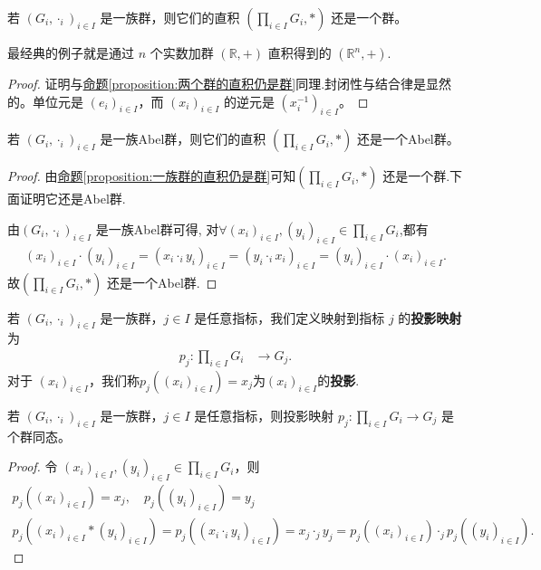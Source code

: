 \documentclass[../../main.tex]{subfiles}
\begin{document}
\begin{proposition}[一族群的直积仍是群]\label{proposition:一族群的直积仍是群}
若 $(G_i,\cdot_i)_{i\in I}$ 是一族群，则它们的直积 $(\prod_{i\in I}G_i,*)$ 还是一个群。  
\end{proposition}
\begin{note}
最经典的例子就是通过 $n$ 个实数加群 $(\mathbb{R},+)$ 直积得到的 $(\mathbb{R}^n,+)$.
\end{note}
\begin{proof}
证明与\hyperref[proposition:两个群的直积仍是群]{命题\ref{proposition:两个群的直积仍是群}}同理.封闭性与结合律是显然的。单位元是 $(e_i)_{i\in I}$，而 $(x_i)_{i\in I}$ 的逆元是 $(x_i^{-1})_{i\in I}$。 
\end{proof}

\begin{proposition}[一族Abel群的直积仍是Abel群]\label{proposition:一族Abel群的直积仍是Abel群}
若 $(G_i,\cdot_i)_{i\in I}$ 是一族Abel群，则它们的直积 $(\prod_{i\in I}G_i,*)$ 还是一个Abel群。  
\end{proposition}
\begin{proof}
由\hyperref[proposition:一族群的直积仍是群]{命题\ref{proposition:一族群的直积仍是群}}可知$(\prod_{i\in I}G_i,*)$ 还是一个群.下面证明它还是Abel群.

由$(G_i,\cdot_i)_{i\in I}$ 是一族Abel群可得,
对$\forall (x_i)_{i\in I},(y_i)_{i\in I} \in \prod_{i\in I}G_i$,都有
\begin{align*}
\left( x_i \right) _{i\in I}\cdot \left( y_i \right) _{i\in I}=\left( x_i\cdot _iy_i \right) _{i\in I}=\left( y_i\cdot _ix_i \right) _{i\in I}=\left( y_i \right) _{i\in I}\cdot \left( x_i \right) _{i\in I}.
\end{align*}
故$(\prod_{i\in I}G_i,*)$ 还是一个Abel群.
\end{proof}

\begin{definition}[投影映射]
若 $(G_i,\cdot_i)_{i\in I}$ 是一族群，$j\in I$ 是任意指标，我们定义映射到指标 $j$ 的\textbf{投影映射}为
\begin{align*}
p_j:\prod_{i\in I}G_i&\to G_j.
\end{align*}
对于 $(x_i)_{i\in I}$，我们称$p_j((x_i)_{i\in I})=x_j$为$(x_i)_{i\in I}$的\textbf{投影}.
\end{definition}

\begin{proposition}[投影映射是群同态]\label{proposition:投影映射是群同态}
若 $(G_i,\cdot_i)_{i\in I}$ 是一族群，$j\in I$ 是任意指标，则投影映射 $p_j:\prod_{i\in I}G_i\to G_j$ 是个群同态。
\end{proposition}
\begin{proof}
令 $(x_i)_{i\in I},(y_i)_{i\in I}\in\prod_{i\in I}G_i$，则
\begin{gather*}
p_j((x_i)_{i\in I})=x_j,\quad p_j((y_i)_{i\in I})=y_j\\
p_j((x_i)_{i\in I}*(y_i)_{i\in I})=p_j((x_i\cdot_i y_i)_{i\in I})=x_j\cdot_j y_j = p_j((x_i)_{i\in I})\cdot_j p_j((y_i)_{i\in I}).
\end{gather*}
\end{proof}
\end{document}

